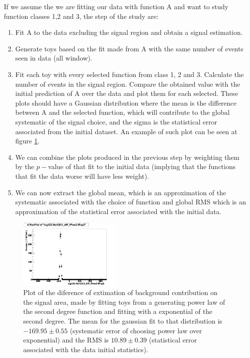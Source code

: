 \documentclass[%
reprint,
amsmath,
amssymb,
aps,
pra,
showkeys
]{revtex4-1}
\begin{document}
If we assume the we are fitting our data with function A and want to study function classes 1,2 and 3, the step of 
the study are:
\begin{enumerate}
 \item Fit A to the data excluding the signal region and obtain a signal estimation.
 \item Generate toys based on the fit made from A with the same number of events seen in data (all window).
 \item Fit each toy with every selected function from class 1, 2 and 3. Calculate the number of events in the signal 
 region. Compare the obtained value with the initial prediction of A over the data and plot them for each selected. 
 These plots should have a Gaussian distribution where the mean is the difference between A and the selected function, 
 which will contribute to the global systematic of the signal choice, and the sigma is the statistical error associated 
 from the initial dataset. An example of such plot can be seen at figure \ref{figure_SystematicAnalysis_Plot}.
 \item We can combine the plots produced in the previous step by weighting them by the $p-$value of that fit to the 
 initial data (implying that the functions that fit the data worse will have less weight).
 \item We can now extract the global mean, which is an approximation of the systematic associated with the choice of 
 function and global RMS which is an approximation of the statistical error associated with the initial data.
\end{enumerate}

\begin{figure}[ht]
\centering
\includegraphics[width=0.45\textwidth]{img/sig122to128_Truth-fPow2_vs_fExp2.png}
\caption{Plot of the diference of extimation of background contribution on the signal area, made by fitting toys from a generating
power law of the second degree function and fitting with a exponential of the second degree. The mean for the gaussian fit to that
distribution is $-169.95\pm0.55$ (systematic error of choosing power law over exponential) and the RMS is $10.89\pm0.39$ (statistical 
error associated with the data initial statistics).}
\label{figure_SystematicAnalysis_Plot}
\end{figure}
\end{document}
